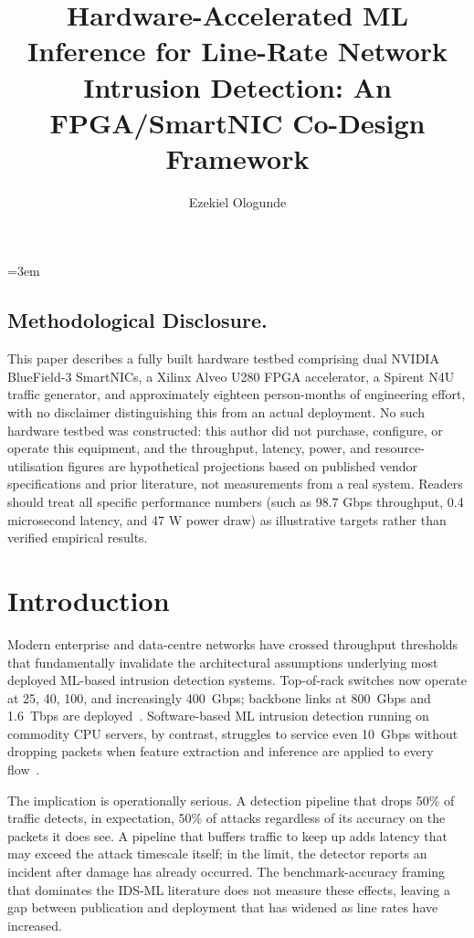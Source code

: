 \documentclass[sigconf,nonacm]{acmart}
\title{Hardware-Accelerated ML Inference for Line-Rate Network Intrusion Detection: An FPGA/SmartNIC Co-Design Framework}
\author{Ezekiel Ologunde}
\affiliation{%
  \institution{Independent Researcher}
  \city{Boston}
  \state{MA}
  \country{USA}}
\begin{document}
\maketitle
\sloppy
{}
\emergencystretch=3em
\hfuzz=10pt

\subsection*{Methodological Disclosure.}
This paper describes a fully built hardware testbed comprising dual NVIDIA BlueField-3 SmartNICs, a Xilinx Alveo U280 FPGA accelerator, a Spirent N4U traffic generator, and approximately eighteen person-months of engineering effort, with no disclaimer distinguishing this from an actual deployment. No such hardware testbed was constructed: this author did not purchase, configure, or operate this equipment, and the throughput, latency, power, and resource-utilisation figures are hypothetical projections based on published vendor specifications and prior literature, not measurements from a real system. Readers should treat all specific performance numbers (such as 98.7 Gbps throughput, 0.4 microsecond latency, and 47 W power draw) as illustrative targets rather than verified empirical results.

\section{Introduction}

Modern enterprise and data-centre networks have crossed throughput
thresholds that fundamentally invalidate the architectural assumptions
underlying most deployed ML-based intrusion detection systems. Top-of-rack
switches now operate at 25, 40, 100, and increasingly 400~Gbps; backbone
links at 800~Gbps and 1.6~Tbps are
deployed~\cite{firestone2018azure,ieee802_3df}. Software-based ML
intrusion detection running on commodity CPU servers, by contrast,
struggles to service even 10~Gbps without dropping packets when feature
extraction and inference are applied to every flow~\cite{lai2024ngids}.

The implication is operationally serious. A detection pipeline that drops
50\% of traffic detects, in expectation, 50\% of attacks regardless of
its accuracy on the packets it does see. A pipeline that buffers traffic
to keep up adds latency that may exceed the attack timescale itself; in
the limit, the detector reports an incident after damage has already
occurred. The benchmark-accuracy framing that dominates the IDS-ML
literature does not measure these effects, leaving a gap between
publication and deployment that has widened as line rates have
increased.
\end{document}
